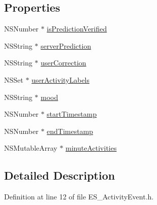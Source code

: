\subsection*{Properties}
\begin{DoxyCompactItemize}
\item 
N\+S\+Number $\ast$ \hyperlink{interface_e_s___activity_event_a9a3ff1116db773b1f40c6baa06bef2eb}{is\+Prediction\+Verified}
\item 
N\+S\+String $\ast$ \hyperlink{interface_e_s___activity_event_ab6a7ddd295a9f7e5adc79e796314632a}{server\+Prediction}
\item 
N\+S\+String $\ast$ \hyperlink{interface_e_s___activity_event_a24bd94d18e8d80df31ca1e876de3b468}{user\+Correction}
\item 
N\+S\+Set $\ast$ \hyperlink{interface_e_s___activity_event_a35041c5e0ff9f74fc2bcf29e0cc4e548}{user\+Activity\+Labels}
\item 
N\+S\+String $\ast$ \hyperlink{interface_e_s___activity_event_a53a4120a72fc6400b5f992c5c9b582f1}{mood}
\item 
N\+S\+Number $\ast$ \hyperlink{interface_e_s___activity_event_a9ce73b93e175574942f4ee5af8d5c9b7}{start\+Timestamp}
\item 
N\+S\+Number $\ast$ \hyperlink{interface_e_s___activity_event_a8f1fd8e2af86190cb2430d1dcde465e6}{end\+Timestamp}
\item 
N\+S\+Mutable\+Array $\ast$ \hyperlink{interface_e_s___activity_event_a8cb77cfb5866f39dc2080534129d7c72}{minute\+Activities}
\end{DoxyCompactItemize}


\subsection{Detailed Description}


Definition at line 12 of file E\+S\+\_\+\+Activity\+Event.\+h.



